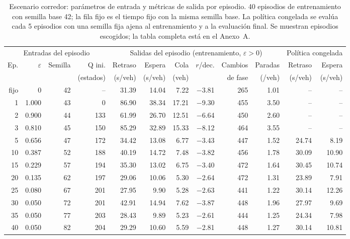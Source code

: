 \begin{table}[H]
\centering
\scriptsize
\setlength{\tabcolsep}{3pt}
\begin{tabular}{rrrrrrrrrrrr}
\toprule
\multicolumn{4}{c}{Entradas del episodio} & \multicolumn{6}{c}{Salidas del episodio (entrenamiento, $\varepsilon>0$)} & \multicolumn{2}{c}{Política congelada} \\
\cmidrule(lr){1-4}\cmidrule(lr){5-10}\cmidrule(lr){11-12}
Ep. & $\varepsilon$ & Semilla & Q ini. & Retraso & Espera & Cola & $r$/dec. & Cambios & Paradas & Retraso & Espera \\
 &  &  & (estados) & (s/veh) & (s/veh) & (veh) &  & de fase & (/veh) & (s/veh) & (s/veh) \\
\midrule
fijo & 0 & 42 & -- & 31.39 & 14.04 & 7.22 & $-$3.81 & 265 & 1.01 & -- & -- \\
\midrule
1 & 1.000 & 43 & 0 & 86.90 & 38.34 & 17.21 & $-$9.30 & 455 & 3.50 & -- & -- \\
2 & 0.900 & 44 & 133 & 61.99 & 26.70 & 12.51 & $-$6.64 & 450 & 2.60 & -- & -- \\
3 & 0.810 & 45 & 150 & 85.29 & 32.89 & 15.33 & $-$8.12 & 464 & 3.55 & -- & -- \\
5 & 0.656 & 47 & 172 & 34.42 & 13.08 & 6.77 & $-$3.43 & 447 & 1.52 & 24.74 & 8.19 \\
10 & 0.387 & 52 & 188 & 40.19 & 14.72 & 7.48 & $-$3.82 & 456 & 1.78 & 30.09 & 10.90 \\
15 & 0.229 & 57 & 194 & 35.30 & 13.02 & 6.75 & $-$3.40 & 472 & 1.64 & 30.45 & 10.74 \\
20 & 0.135 & 62 & 197 & 29.06 & 10.06 & 5.30 & $-$2.64 & 472 & 1.31 & 23.89 & 7.91 \\
25 & 0.080 & 67 & 201 & 27.95 & 9.90 & 5.28 & $-$2.63 & 441 & 1.22 & 30.14 & 12.26 \\
30 & 0.050 & 72 & 201 & 42.91 & 14.94 & 7.62 & $-$3.87 & 448 & 1.96 & 27.97 & 9.69 \\
35 & 0.050 & 77 & 203 & 28.43 & 9.89 & 5.23 & $-$2.61 & 444 & 1.25 & 24.34 & 7.98 \\
40 & 0.050 & 82 & 204 & 29.29 & 10.60 & 5.59 & $-$2.81 & 448 & 1.27 & 30.14 & 10.81 \\
\bottomrule
\end{tabular}
\caption[Escenario corredor: episodios de entrenamiento]{Escenario corredor: parámetros de entrada y métricas de salida por episodio. 40 episodios de entrenamiento con semilla base 42; la fila fijo es el tiempo fijo con la misma semilla base. La política congelada se evalúa cada 5 episodios con una semilla fija ajena al entrenamiento y a la evaluación final. Se muestran episodios escogidos; la tabla completa está en el Anexo~A.}
\label{tab:corredor-episodios-resumen}
\end{table}

